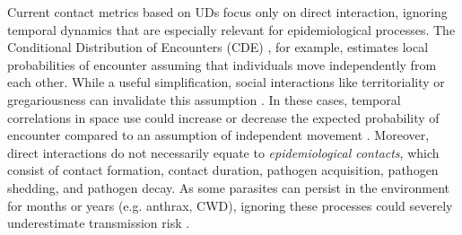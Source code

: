 \documentclass[letterpaper]{article}
\begin{document}
Current contact metrics based on UDs focus only on direct interaction, ignoring temporal dynamics that are especially relevant for epidemiological processes. The Conditional Distribution of Encounters (CDE) \citep{Noonan2021}, for example, estimates local probabilities of encounter assuming that individuals move independently from each other.
While a useful simplification, social interactions like territoriality or gregariousness can invalidate this assumption \citep{Manlove2018,Sah2018}. In these cases, temporal correlations in space use could increase or decrease the expected probability of encounter compared to an assumption of independent movement \citep{Kjaer2008,Schauber2015a}. 
Moreover, direct interactions do not necessarily equate to \emph{epidemiological contacts}, which consist of contact formation, contact duration, pathogen acquisition, pathogen shedding, and pathogen decay. As some parasites can persist in the environment for months or years (e.g. anthrax, CWD), ignoring these processes could severely underestimate transmission risk \citep{Wilber2022,Yang2023,Richardson2015}.

\end{document}
